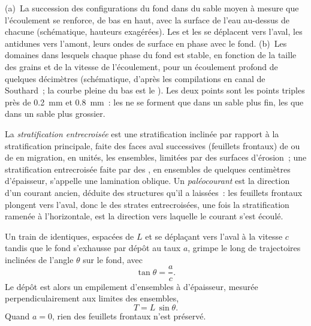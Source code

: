 \begin{omfigure}
{\small (a)~La succession des configurations du fond dans du sable moyen à mesure que l'écoulement
se renforce, de bas en haut, avec la surface de l'eau au-dessus de chacune (schématique,
hauteurs exagérées). Les  et les  se déplacent vers l'aval, les antidunes vers l'amont,
leurs ondes de surface en phase avec le fond. (b)~Les domaines dans lesquels chaque phase du fond
est stable, en fonction de la taille des grains et de la vitesse de l'écoulement, pour un écoulement profond de quelques
décimètres (schématique, d'après les compilations en canal de Southard~; la courbe
pleine du bas est le ). Les deux points sont les points
triples près de \qty{0.2}{mm} et \qty{0.8}{mm}~: les  ne se forment que dans un sable plus fin,
les  que dans un sable plus grossier.}
\label{fig:b1:clastic-sediments:bed-phases}
\end{omfigure}

\begin{definition}\label{def:b1:clastic-sediments:cross-bedding}
La \emph{stratification entrecroisée} est une stratification inclinée par rapport à la
stratification principale, faite des faces aval successives (feuillets frontaux) de  ou de
 en migration, en unités, les ensembles, limitées par des surfaces d'érosion~; une stratification entrecroisée faite par
des , en ensembles de quelques centimètres d'épaisseur, s'appelle une lamination oblique. Un
\emph{paléocourant} est la direction d'un courant ancien,
déduite des structures qu'il a laissées~: les feuillets frontaux plongent vers l'aval, donc
le  des strates entrecroisées, une fois la stratification ramenée à
l'horizontale, est la direction vers laquelle le courant s'est écoulé.
\end{definition}

\begin{proposition}\label{prop:b1:clastic-sediments:climb}
Un train de  identiques, espacées de $L$ et se déplaçant vers l'aval à la vitesse
$c$ tandis que le fond s'exhausse par dépôt au taux $a$, grimpe le long de trajectoires
inclinées de l'angle $\theta$ sur le fond, avec
\[
  \tan\theta = \frac{a}{c}.
\]
Le dépôt est alors un empilement d'ensembles à  d'épaisseur, mesurée
perpendiculairement aux limites des ensembles,
\[
  T = L\,\sin\theta .
\]
Quand $a = 0$, rien des feuillets frontaux n'est préservé.
\end{proposition}

